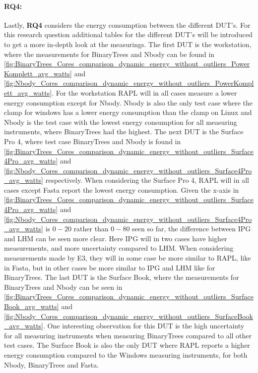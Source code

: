 


\paragraph*{RQ4:} Lastly, \textbf{RQ4} considers the energy consumption between the different DUT's. For this research question additional tables for the different DUT's will be introduced to get a more in-depth look at the measurings. The first DUT is the workstation, where the measurements for BinaryTrees and Nbody can be found in \cref{fig:BinaryTrees_Cores_comparison_dynamic_energy_without_outliers_PowerKomplett_avg_watts} and \cref{fig:Nbody_Cores_comparison_dynamic_energy_without_outliers_PowerKomplett_avg_watts}. For the workstation RAPL will in all cases measure a lower energy consumption except for Nbody. Nbody is also the only test case where the clamp for windows has a lower energy consumption than the clamp on Linux and Nbody is the test case with the lowest energy consumption for all measuring instruments, where BinaryTrees had the highest. The next DUT is the Surface Pro 4, where test case BinaryTrees and Nbody is found in \cref{fig:BinaryTrees_Cores_comparison_dynamic_energy_without_outliers_Surface4Pro_avg_watts} and \cref{fig:Nbody_Cores_comparison_dynamic_energy_without_outliers_Surface4Pro_avg_watts} respectively. When considering the Surface Pro 4, RAPL will in all cases except Fasta report the lowest energy consumption. Given the x-axis in \cref{fig:BinaryTrees_Cores_comparison_dynamic_energy_without_outliers_Surface4Pro_avg_watts} and \cref{fig:Nbody_Cores_comparison_dynamic_energy_without_outliers_Surface4Pro_avg_watts} is $0-20$ rather than $0-80$ seen so far, the difference between IPG and LHM can be seen more clear. Here IPG will in two cases have higher measurements, and more uncertainty compared to LHM. When considering measurements made by E3, they will in some case be more similar to RAPL, like in Fasta, but in other cases be more similar to IPG and LHM like for BinaryTrees. The last DUT is the Surface Book, where the measurements for BinaryTrees and Nbody can be seen in \cref{fig:BinaryTrees_Cores_comparison_dynamic_energy_without_outliers_SurfaceBook_avg_watts} and \cref{fig:Nbody_Cores_comparison_dynamic_energy_without_outliers_SurfaceBook_avg_watts}. One interesting observation for this DUT is the high uncertainty for all measuring instruments when measuring BinaryTrees compared to all other test cases. The Surface Book is also the only DUT where RAPL reports a higher energy consumption compared to the Windows measuring instruments, for both Nbody, BinaryTrees and Fasta.




